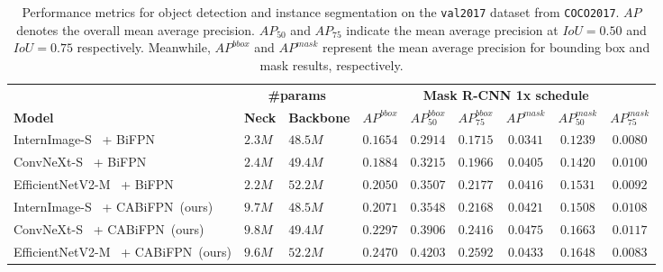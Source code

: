 \begin{table}[!htbp]
\begin{adjustbox}{max width=\textwidth}
\begin{tabular}{l|ll|cccccc|}
\cline{2-9}
\textbf{}                                           & \multicolumn{2}{c|}{\textbf{\#params}}                                     & \multicolumn{6}{c|}{\textbf{Mask R-CNN 1x schedule}}                                                                                                                                                               \\ \cline{1-1}
\multicolumn{1}{|l|}{\textbf{Model}}                & \multicolumn{1}{c}{\textbf{Neck}} & \multicolumn{1}{c|}{\textbf{Backbone}} & \multicolumn{1}{c}{\textbf{$AP^{bbox}$}} & \multicolumn{1}{c}{\textbf{$AP^{bbox}_{50}$}} & \multicolumn{1}{c}{\textbf{$AP^{bbox}_{75}$}} & \multicolumn{1}{c}{\textbf{$AP^{mask}$}} & \multicolumn{1}{c}{\textbf{$AP^{mask}_{50}$}} & \multicolumn{1}{c|}{\textbf{$AP^{mask}_{75}$}} \\ \hline
\multicolumn{1}{|l|}{InternImage-S~\cite{wang2023internimage} + BiFPN~\cite{tan2020efficientdet}}         & $2.3M$ & $48.5M$ & $0.1654$ & $0.2914$ & $0.1715$ & $0.0341$ & $0.1239$ & $0.0080$ \\
\multicolumn{1}{|l|}{ConvNeXt-S~\cite{liu2022convnet} + BiFPN~\cite{tan2020efficientdet}}            & $2.4M$ & $49.4M$ & $0.1884$ & $0.3215$ & $0.1966$ & $0.0405$ & $0.1420$ & $0.0100$ \\
\multicolumn{1}{|l|}{EfficientNetV2-M~\cite{tan2021efficientnetv2} + BiFPN~\cite{tan2020efficientdet}}   & $2.2M$ & $52.2M$ & $0.2050$ & $0.3507$ & $0.2177$ & $0.0416$ & $0.1531$ & $0.0092$ \\ \hline
\multicolumn{1}{|l|}{InternImage-S~\cite{wang2023internimage} + CABiFPN~(ours)}       & $9.7M$ & $48.5M$ & $0.2071$ & $0.3548$ & $0.2168$ & $0.0421$ & $0.1508$ & $0.0108$ \\
\multicolumn{1}{|l|}{ConvNeXt-S~\cite{liu2022convnet} + CABiFPN~(ours)}          & $9.8M$ & $49.4M$ & $0.2297$ & $0.3906$ & $0.2416$ & $0.0475$ & $0.1663$ & $0.0117$ \\
\multicolumn{1}{|l|}{EfficientNetV2-M~\cite{tan2021efficientnetv2} + CABiFPN~(ours)} & $9.6M$ & $52.2M$ & $0.2470$ & $0.4203$ & $0.2592$ & $0.0433$ & $0.1648$ & $0.0083$ \\ \hline
\end{tabular}
\end{adjustbox}
\caption[Performance metrics for object detection and instance segmentation on the \texttt{val2017} dataset from \texttt{COCO2017}.]{Performance metrics for object detection and instance segmentation on the \texttt{val2017} dataset from \texttt{COCO2017}. \textbf{$AP$} denotes the overall mean average precision. \textbf{$AP_{50}$} and \textbf{$AP_{75}$} indicate the mean average precision at $IoU=0.50$ and $IoU=0.75$ respectively. Meanwhile, \textbf{$AP^{bbox}$} and \textbf{$AP^{mask}$} represent the mean average precision for bounding box and mask results, respectively.}
\label{table:results:main}
\end{table}


